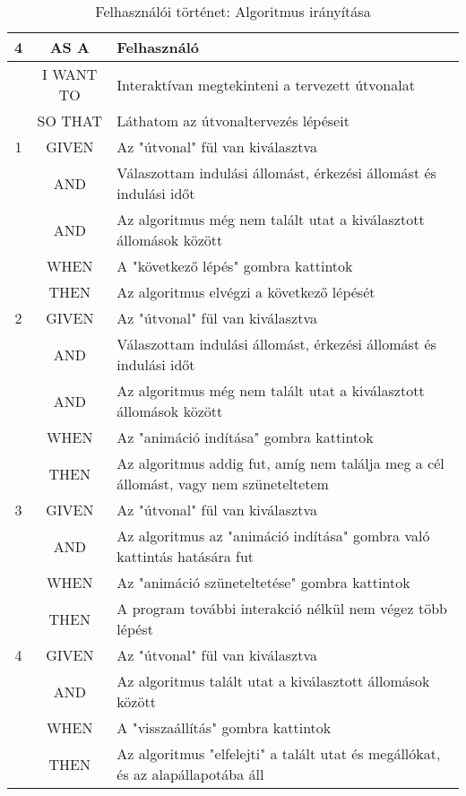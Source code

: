 \begin{table}[H]
    \centering
    \begin{tabular}{|c|c|p{10cm}|}
        \hline
        \textbf{4}
        & AS A          & Felhasználó \\ \hline
        & I WANT TO     & Interaktívan megtekinteni a tervezett útvonalat \\ \hline
        & SO THAT       & Láthatom az útvonaltervezés lépéseit \\ \hline
        \hline
        1 & GIVEN   & Az "útvonal" fül van kiválasztva \\ \hline
        & AND     & Válaszottam indulási állomást, érkezési állomást és indulási időt \\ \hline
        & AND     & Az algoritmus még nem talált utat a kiválasztott állomások között \\ \hline
        & WHEN    & A "következő lépés" gombra kattintok \\ \hline
        & THEN    & Az algoritmus elvégzi a következő lépését \\ \hline
        \hline
        2 & GIVEN   & Az "útvonal" fül van kiválasztva \\ \hline
        & AND     & Válaszottam indulási állomást, érkezési állomást és indulási időt \\ \hline
        & AND     & Az algoritmus még nem talált utat a kiválasztott állomások között \\ \hline
        & WHEN    & Az "animáció indítása" gombra kattintok \\ \hline
        & THEN    & Az algoritmus addig fut, amíg nem találja meg a cél állomást, vagy nem szüneteltetem \\ \hline
        \hline
        3 & GIVEN   & Az "útvonal" fül van kiválasztva \\ \hline
        & AND     & Az algoritmus az "animáció indítása" gombra való kattintás hatására fut \\ \hline
        & WHEN    & Az "animáció szüneteltetése" gombra kattintok \\ \hline
        & THEN    & A program további interakció nélkül nem végez több lépést \\ \hline
        \hline
        4 & GIVEN   & Az "útvonal" fül van kiválasztva \\ \hline
        & AND     & Az algoritmus talált utat a kiválasztott állomások között \\ \hline
        & WHEN    & A "visszaállítás" gombra kattintok \\ \hline
        & THEN    & Az algoritmus "elfelejti" a talált utat és megállókat, és az alapállapotába áll \\ \hline
    \end{tabular}
    \caption{Felhasználói történet: Algoritmus irányítása}
    \label{tab:user-stories-control}
\end{table}

